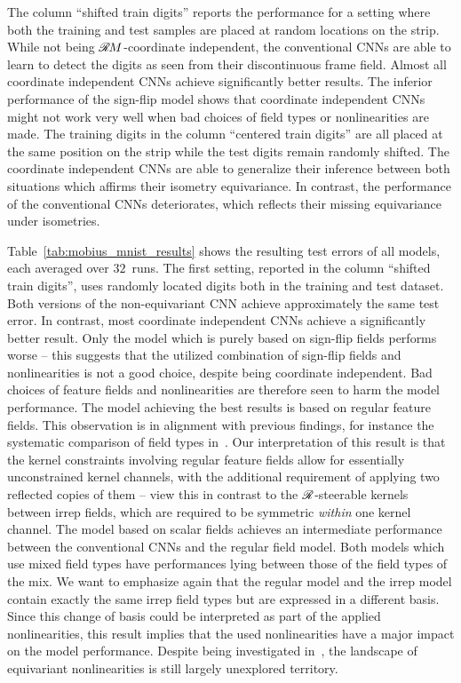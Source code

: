 \begin{table}
{        The column ``shifted train digits'' reports the performance for a setting where both the training and test samples are placed at random locations on the strip.
        While not being $\mathscr{R}\mkern-1.8muM$-coordinate independent, the conventional CNNs are able to learn to detect the digits as seen from their discontinuous frame field.
        Almost all coordinate independent CNNs achieve significantly better results.
        The inferior performance of the sign-flip model shows that coordinate independent CNNs might not work very well when bad choices of field types or nonlinearities are made.
        The training digits in the column ``centered train digits'' are all placed at the same position on the strip while the test digits remain randomly shifted.
        The coordinate independent CNNs are able to generalize their inference between both situations which affirms their isometry equivariance.
        In contrast, the performance of the conventional CNNs deteriorates, which reflects their missing equivariance under isometries.
    }
    \label{tab:mobius_mnist_results}
\end{table}

Table~\ref{tab:mobius_mnist_results} shows the resulting test errors of all models, each averaged over $32$~runs.
The first setting, reported in the column ``shifted train digits'', uses randomly located digits both in the training and test dataset.
Both versions of the non-equivariant CNN achieve approximately the same test error.
In contrast, most coordinate independent CNNs achieve a significantly better result.
Only the model which is purely based on sign-flip fields performs worse -- this suggests that the utilized combination of sign-flip fields and nonlinearities is not a good choice, despite being coordinate independent.
Bad choices of feature fields and nonlinearities are therefore seen to harm the model performance.
The model achieving the best results is based on regular feature fields.
This observation is in alignment with previous findings, for instance the systematic comparison of field types in~\cite{Weiler2019_E2CNN}.
Our interpretation of this result is that the kernel constraints involving regular feature fields allow for essentially unconstrained kernel channels, with the additional requirement of applying two reflected copies of them -- view this in contrast to the $\mathscr{R}$-steerable kernels between irrep fields, which are required to be symmetric \emph{within} one kernel channel.
The model based on scalar fields achieves an intermediate performance between the conventional CNNs and the regular field model.
Both models which use mixed field types have performances lying between those of the field types of the mix.
We want to emphasize again that the regular model and the irrep model contain exactly the same irrep field types but are expressed in a different basis.
Since this change of basis could be interpreted as part of the applied nonlinearities, this result implies that the used nonlinearities have a major impact on the model performance.
Despite being investigated in~\cite{Weiler2019_E2CNN}, the landscape of equivariant nonlinearities is still largely unexplored territory.

